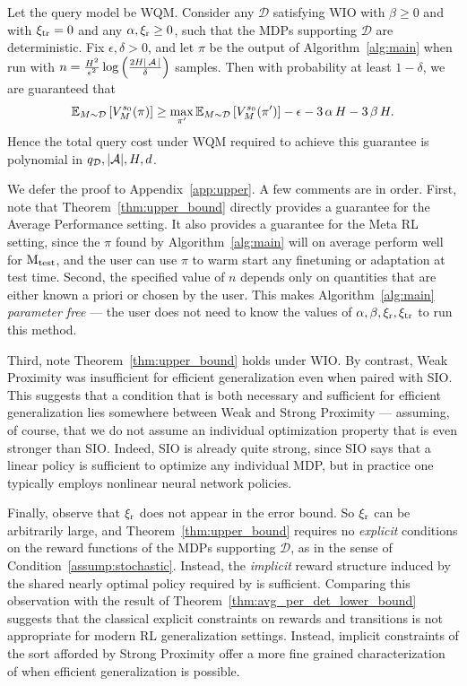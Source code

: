 \documentclass[11pt,twoside]{article}
\begin{document}
\begin{theorem}
\label{thm:upper_bound}
Let the query model be WQM. Consider any $\mathcal{D}$ satisfying WIO with $\beta \geq 0$ and \strprox{} with $\operatorname{\xi_{tr}} = 0$ and any $\operatorname{\alpha}, \operatorname{\xi_r} \geq 0$, such that the MDPs supporting $\mathcal{D}$ are deterministic. Fix $\epsilon, \delta > 0$, and let $\pi$ be the output of Algorithm~\ref{alg:main} when run with $n = \frac{H^2}{\epsilon^2} \log \left( \frac{2 H \vert \operatorname{\mathcal{A}} \vert}{\delta} \right)$ samples. Then with probability at least $1 - \delta$, we are guaranteed that
\begin{equation*}
\operatorname{\mathbb{E}}_{M \sim \mathcal{D}} \left[ V^{{s_0 }}_{{M }}({\pi}) \right] \geq \max_{\pi'} \operatorname{\mathbb{E}}_{M \sim \mathcal{D}} \left[ V^{{s_0 }}_{{M }}({\pi'}) \right] - \epsilon - 3 \operatorname{\alpha} H - 3 \operatorname{\beta} H.
\end{equation*}
Hence the total query cost under WQM required to achieve this guarantee is polynomial in $q_{\mathcal{D}}, \vert \mathcal{A} \vert, H, d$.
\end{theorem}

\noindent We defer the proof to Appendix~\ref{app:upper}. A few comments are in order. First, note that Theorem~\ref{thm:upper_bound} directly provides a guarantee for the Average Performance setting. It also provides a guarantee for the Meta RL setting, since the $\pi$ found by Algorithm~\ref{alg:main} will on average perform well for $\operatorname{M_{test}}$, and the user can use $\pi$ to warm start any finetuning or adaptation at test time. Second, the specified value of $n$ depends only on quantities that are either known a priori or chosen by the user. This makes Algorithm~\ref{alg:main} \emph{parameter free} --- the user does not need to know the values of $\operatorname{\alpha}, \operatorname{\beta}, \operatorname{\xi_r}, \operatorname{\xi_{tr}}$ to run this method.

Third, note Theorem~\ref{thm:upper_bound} holds under WIO. By contrast, Weak Proximity was insufficient for efficient generalization even when paired with SIO. This suggests that a condition that is both necessary and sufficient for efficient generalization lies somewhere between Weak and Strong Proximity --- assuming, of course, that we do not assume an individual optimization property that is even stronger than SIO. Indeed, SIO is already quite strong, since SIO says that a linear policy is sufficient to optimize any individual MDP, but in practice one typically employs nonlinear neural network policies.

Finally, observe that $\operatorname{\xi_r}$ does not appear in the error bound. So $\operatorname{\xi_r}$ can be arbitrarily large, and Theorem~\ref{thm:upper_bound} requires no \emph{explicit} conditions on the reward functions of the MDPs supporting $\mathcal{D}$, as in the sense of Condition~\ref{assump:stochastic}. Instead, the \emph{implicit} reward structure induced by the shared nearly optimal policy required by \strprox{} is sufficient. Comparing this observation with the result of Theorem~\ref{thm:avg_per_det_lower_bound} suggests that the classical explicit constraints on rewards and transitions is not appropriate for modern RL generalization settings. Instead, implicit constraints of the sort afforded by Strong Proximity offer a more fine grained characterization of when efficient generalization is possible.
\end{document}

